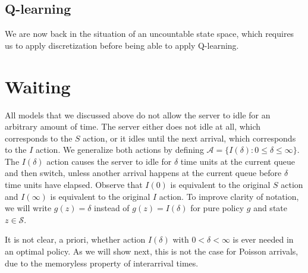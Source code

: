 \documentclass{article}
\theoremstyle{definition}
\theoremstyle{plain}
\begin{document}
\subsection{Q-learning}
We are now back in the situation of an uncountable state space, which requires
us to apply discretization before being able to apply Q-learning.


\section{Waiting}

All models that we discussed above do not allow the server to idle for an
arbitrary amount of time. The server either does not idle at all, which
corresponds to the $S$ action, or it idles until the next arrival, which
corresponds to the $I$ action. We generalize both actions by defining
$\mathcal{A} = \{ I(\delta) : 0 \leq \delta \leq \infty \}$. The $I(\delta)$ action causes the
server to idle for $\delta$ time units at the current queue and then switch, unless
another arrival happens at the current queue before $\delta$ time units have elapsed.
Observe that $I(0)$ is equivalent to the original $S$ action and $I(\infty)$ is
equivalent to the original $I$ action. To improve clarity of notation, we will
write $g(z) = \delta$ instead of $g(z) = I(\delta)$ for pure policy $g$ and
state $z \in \mathcal{S}$.

It is not clear, a priori, whether action $I(\delta)$ with $0 < \delta < \infty$
is ever needed in an optimal policy. As we will show next, this is not the case
for Poisson arrivals, due to the memoryless property of interarrival times.
\end{document}
